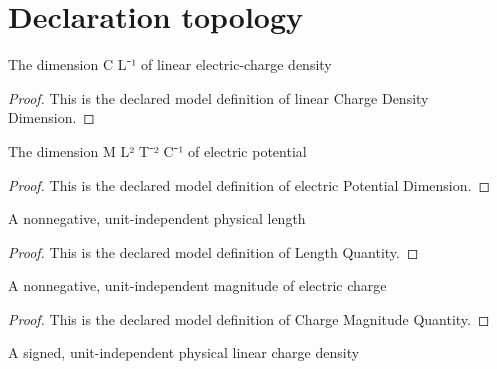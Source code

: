 \section{Declaration topology}
\begin{definition}
  \label{def:physics:phyx-mini-0863:phyxminiproblems-problemphyxmini0863-linearchargedensitydimension}
  The dimension C L⁻¹ of linear electric-charge density
\end{definition}
\begin{proof}
  This is the declared model definition of linear Charge Density Dimension.
\end{proof}
\begin{definition}
  \label{def:physics:phyx-mini-0863:phyxminiproblems-problemphyxmini0863-electricpotentialdimension}
  The dimension M L² T⁻² C⁻¹ of electric potential
\end{definition}
\begin{proof}
  This is the declared model definition of electric Potential Dimension.
\end{proof}
\begin{definition}
  \label{def:physics:phyx-mini-0863:phyxminiproblems-problemphyxmini0863-lengthquantity}
  A nonnegative, unit-independent physical length
\end{definition}
\begin{proof}
  This is the declared model definition of Length Quantity.
\end{proof}
\begin{definition}
  \label{def:physics:phyx-mini-0863:phyxminiproblems-problemphyxmini0863-chargemagnitudequantity}
  A nonnegative, unit-independent magnitude of electric charge
\end{definition}
\begin{proof}
  This is the declared model definition of Charge Magnitude Quantity.
\end{proof}
\begin{definition}
  \label{def:physics:phyx-mini-0863:phyxminiproblems-problemphyxmini0863-linearchargedensityquantity}
  A signed, unit-independent physical linear charge density
\end{definition}
